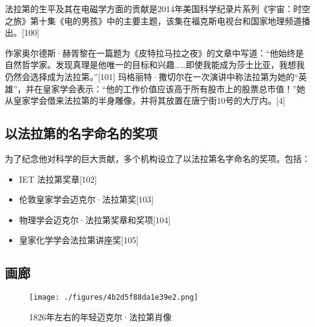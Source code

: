 法拉第的生平及其在电磁学方面的贡献是2014年美国科学纪录片系列《宇宙：时空之旅》第十集《电的男孩》中的主要主题，该集在福克斯电视台和国家地理频道播出。[100]

作家奥尔德斯·赫胥黎在一篇题为《皮特拉马拉之夜》的文章中写道：“他始终是自然哲学家。发现真理是他唯一的目标和兴趣……即使我能成为莎士比亚，我想我仍然会选择成为法拉第。”[101] 玛格丽特·撒切尔在一次演讲中称法拉第为她的“英雄”，并在皇家学会表示：“他的工作价值应该高于所有股市上的股票总市值！”她从皇家学会借来法拉第的半身雕像，并将其放置在唐宁街10号的大厅内。[4]
\subsection{以法拉第的名字命名的奖项 } 
为了纪念他对科学的巨大贡献，多个机构设立了以法拉第名字命名的奖项。包括：
\begin{itemize}
\item IET 法拉第奖章[102]  
\item 伦敦皇家学会迈克尔·法拉第奖[103]  
\item 物理学会迈克尔·法拉第奖章和奖项[104]  
\item 皇家化学学会法拉第讲座奖[105]
\end{itemize}
\subsection{画廊}
\begin{figure}[ht]
\centering
\texttt{[image: ./figures/4b2d5f88da1e39e2.png]}
\caption{1826年左右的年轻迈克尔·法拉第肖像} \label{fig_FLD_2}
\end{figure}



